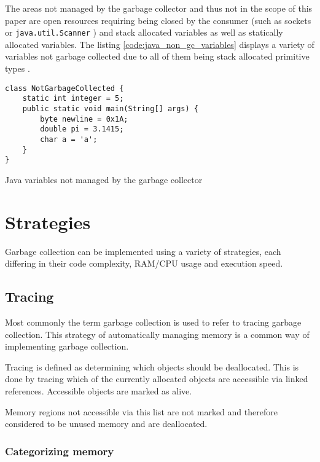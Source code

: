 The areas not managed by the garbage collector and thus not in the scope of
this paper are open resources requiring being closed by the consumer (such as
sockets or \texttt{java.util.Scanner} \cite[close]{java-util-scanner}) and
stack allocated variables as well as statically allocated variables. The
listing \autoref{code:java_non_gc_variables} displays a variety of variables
not garbage collected due to all of them being stack allocated primitive types
\cite[4.2. Primitive Types and Values]{java_language_spec_2023}.

\begin{listing}[H] 
    \begin{verbatim} 
class NotGarbageCollected {
    static int integer = 5;
    public static void main(String[] args) {
        byte newline = 0x1A;
        double pi = 3.1415;
        char a = 'a';
    }
}
    \end{verbatim}
    \caption{Java variables not managed by the garbage collector}
    \label{code:java_non_gc_variables}
\end{listing}

\section{Strategies}

Garbage collection can be implemented using a variety of strategies, each
differing in their code complexity, RAM/CPU usage and execution speed.

\subsection{Tracing}

Most commonly the term garbage collection is used to refer to tracing garbage
collection. This strategy of automatically managing memory is a common way of
implementing garbage collection.

Tracing is defined as determining which objects should be deallocated. This is
done by tracing which of the currently allocated objects are accessible via
linked references. Accessible objects are marked as alive.

Memory regions not accessible via this list are not marked and therefore
considered to be unused memory and are deallocated.

\subsubsection{Categorizing memory}

